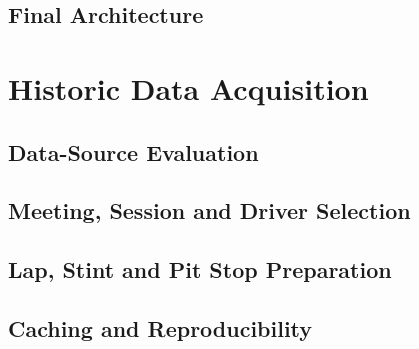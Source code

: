 \subsection{Final Architecture}

\section{Historic Data Acquisition}
\label{sec:data-acquisition}

\subsection{Data-Source Evaluation}

\subsection{Meeting, Session and Driver Selection}

\subsection{Lap, Stint and Pit Stop Preparation}

\subsection{Caching and Reproducibility}

